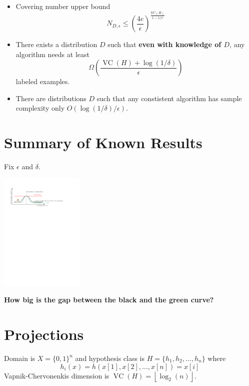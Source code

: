 \documentclass[30pt,landscape]{sciposter}
\DeclareMathOperator{\VC}{VC}
\begin{document}
\begin{multicols}{3}
\begin{itemize}
\vspace{0.5cm}

\item Covering number upper bound
$$
N_{D,\epsilon} \le \left( \frac{4e}{\epsilon} \right)^{\displaystyle \frac{VC(H)}{1 - 1/e}}
$$

\vspace{0.5cm}

\item There exists a distribution $D$ such that \textbf{even with knowledge of $D$},
any algorithm needs at least
$$
\Omega \left( \frac{\VC(H) + \log(1/\delta)}{\epsilon} \right)
$$
labeled examples.

\vspace{0.5cm}

\item There are distributions $D$ such that any constistent algorithm
has sample complexity only $O(\log(1/\delta)/\epsilon)$.
\end{itemize}

\columnbreak

\section*{Summary of Known Results}

Fix $\epsilon$ and $\delta$.

\vspace{1cm}

\begin{center}
\includegraphics[width=0.3\textwidth]{figure-1}
\end{center}

\textbf{How big is the gap between the black and the green curve?}

\section*{Projections}

Domain is $X = \{0,1\}^n$ and hypothesis class is $H = \{h_1, h_2, \dots, h_n\}$
where
$$
h_i(x) = h(x[1], x[2], \dots, x[n]) = x[i]
$$
Vapnik-Chervonenkis dimension is $\VC(H) = \left \lfloor \log_2(n) \right \rfloor$.


\end{multicols}
\end{document}
